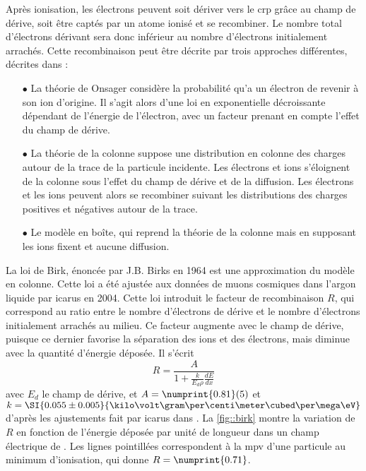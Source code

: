         Après ionisation, les électrons peuvent soit dériver vers le \gls{crp} grâce au champ de dérive, soit être captés par un atome ionisé et se recombiner. Le nombre total d'électrons dérivant sera donc inférieur au nombre d'électrons initialement arrachés. Cette recombinaison peut être décrite par trois approches différentes, décrites dans \cite{Amoruso2004}:
        \begin{itemize}
          \item[$\bullet$] La théorie de Onsager considère la probabilité qu'a un électron de revenir à son ion d'origine. Il s'agit alors d'une loi en exponentielle décroissante dépendant de l'énergie de l'électron, avec un facteur prenant en compte l'effet du champ de dérive.
          \item[$\bullet$] La théorie de la colonne suppose une distribution en colonne des charges autour de la trace de la particule incidente. Les électrons et ions s'éloignent de la colonne sous l'effet du champ de dérive et de la diffusion. Les électrons et les ions peuvent alors se recombiner suivant les distributions des charges positives et négatives autour de la trace.
          \item[$\bullet$] Le modèle en boîte, qui reprend la théorie de la colonne mais en supposant les ions fixent et aucune diffusion.
        \end{itemize}
        La loi de Birk, énoncée par J.B. Birks en 1964\cite{Birk1964} est une approximation du modèle en colonne. Cette loi a été ajustée aux données de muons cosmiques dans l'argon liquide par \gls{icarus} en 2004\cite{Amoruso2004}. Cette loi introduit le facteur de recombinaison $R$, qui correspond au ratio entre le nombre d'électrons de dérive et le nombre d'électrons initialement arrachés au milieu. Ce facteur augmente avec le champ de dérive, puisque ce dernier favorise la séparation des ions et des électrons, mais diminue avec la quantité d'énergie déposée. Il s'écrit
        \begin{equation}\label{eq::R}
          R=\frac{A}{1+\frac{k}{E_d \rho}\frac{dE}{dx}}
        \end{equation}
        avec $E_d$ le champ de dérive, et $A=\numprint{0.81}(5)$ et $k=\SI{0.055\pm0.005}{\kilo\volt\gram\per\centi\meter\cubed\per\mega\eV}$ d'après les ajustements fait par \gls{icarus} dans \cite{Amoruso2004}. La \autoref{fig::birk} montre la variation de $R$ en fonction de l'énergie déposée par unité de longueur dans un champ électrique de \driftfield{}. Les lignes pointillées correspondent à la \gls{mpv} d'une particule au minimum d'ionisation, qui donne $R=\numprint{0.71}$.

